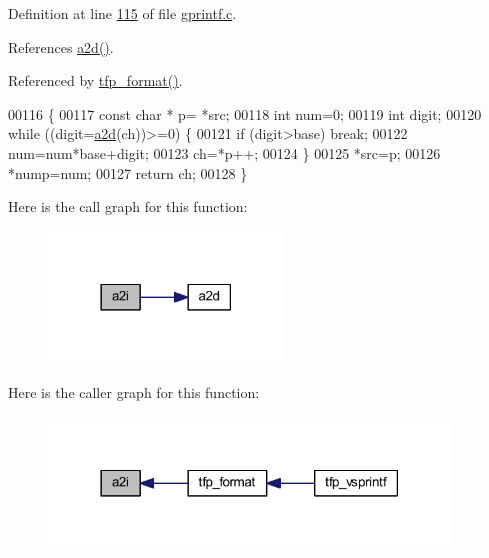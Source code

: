 Definition at line \hyperlink{a00043_source_l00115}{115} of file \hyperlink{a00043_source}{gprintf.\+c}.



References \hyperlink{a00043_source_l00104}{a2d()}.



Referenced by \hyperlink{a00043_source_l00143}{tfp\+\_\+format()}.


\begin{DoxyCode}
00116     \{
00117     \textcolor{keyword}{const} \textcolor{keywordtype}{char}  * p= *src;
00118     \textcolor{keywordtype}{int} num=0;
00119     \textcolor{keywordtype}{int} digit;
00120     \textcolor{keywordflow}{while} ((digit=\hyperlink{a00043_a0f3bca7da68487662b7dff4aa60e2079}{a2d}(ch))>=0) \{
00121         \textcolor{keywordflow}{if} (digit>base) \textcolor{keywordflow}{break};
00122         num=num*base+digit;
00123         ch=*p++;
00124         \}
00125     *src=p;
00126     *nump=num;
00127     \textcolor{keywordflow}{return} ch;
00128     \}
\end{DoxyCode}


Here is the call graph for this function\+:\nopagebreak
\begin{figure}[H]
\begin{center}
\leavevmode
\includegraphics[width=177pt]{d6/d42/a00043_aeadd3398ed3a27d05fd6638133feb559_cgraph}
\end{center}
\end{figure}




Here is the caller graph for this function\+:\nopagebreak
\begin{figure}[H]
\begin{center}
\leavevmode
\includegraphics[width=302pt]{d6/d42/a00043_aeadd3398ed3a27d05fd6638133feb559_icgraph}
\end{center}
\end{figure}


